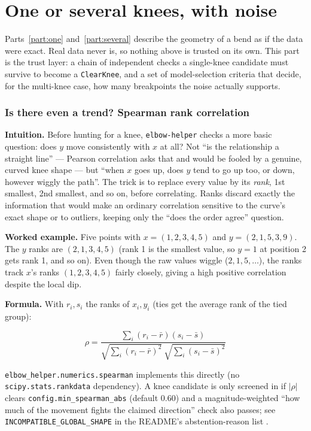 \documentclass[11pt]{article}
\newcommand{\code}[1]{\texttt{#1}}
\begin{document}
\part{One or several knees, with noise}
\label{part:noise}

Parts~\ref{part:one} and~\ref{part:several} describe the geometry of a bend
as if the data were exact. Real data never is, so nothing above is trusted
on its own. This part is the trust layer: a chain of independent checks a
single-knee candidate must survive to become a \code{ClearKnee}, and a set
of model-selection criteria that decide, for the multi-knee case, how many
breakpoints the noise actually supports.

\section{Is there even a trend? Spearman rank correlation}

\textbf{Intuition.} Before hunting for a knee, \code{elbow-helper} checks a
more basic question: does $y$ move consistently with $x$ at all? Not ``is
the relationship a straight line'' --- Pearson correlation asks that and
would be fooled by a genuine, curved knee shape --- but ``when $x$ goes up,
does $y$ tend to go up too, or down, however wiggly the path''. The trick is
to replace every value by its \emph{rank}, 1st smallest, 2nd smallest, and
so on, before correlating. Ranks discard exactly the information that would
make an ordinary correlation sensitive to the curve's exact shape or to
outliers, keeping only the ``does the order agree'' question.

\textbf{Worked example.} Five points with $x = (1,2,3,4,5)$ and $y =
(2,1,5,3,9)$. The $y$ ranks are $(2,1,3,4,5)$ (rank 1 is the smallest
value, so $y=1$ at position 2 gets rank 1, and so on). Even though the raw
values wiggle ($2, 1, 5, \dots$), the ranks track $x$'s ranks $(1,2,3,4,5)$
fairly closely, giving a high positive correlation despite the local dip.

\textbf{Formula.} With $r_i, s_i$ the ranks of $x_i, y_i$ (ties get the
average rank of the tied group):

\begin{equation}
\rho = \frac{\sum_i (r_i - \bar r)(s_i - \bar s)}{\sqrt{\sum_i (r_i - \bar r)^2}\ \sqrt{\sum_i (s_i - \bar s)^2}}
\end{equation}

\code{elbow\_helper.numerics.spearman} implements this directly (no
\code{scipy.stats.rankdata} dependency). A knee candidate is only screened
in if $|\rho|$ clears \code{config.min\_spearman\_abs} (default $0.60$) and
a magnitude-weighted ``how much of the movement fights the claimed
direction'' check also passes; see \code{INCOMPATIBLE\_GLOBAL\_SHAPE} in
the README's abstention-reason list \citep{spearman1904}.
\end{document}
